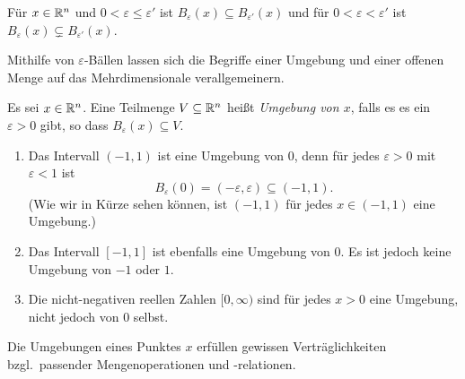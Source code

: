 \documentclass[a4paper,10pt]{article}
\begin{document}
\begin{bem}
 Für $x \in \mathbb{R}^n$ und $0 < \varepsilon \leq \varepsilon'$ ist $B_\varepsilon(x) \subseteq B_{\varepsilon'}(x)$ und für $0 < \varepsilon < \varepsilon'$ ist $B_\varepsilon(x) \subsetneq B_{\varepsilon'}(x)$.
\end{bem}


Mithilfe von $\varepsilon$-Bällen lassen sich die Begriffe einer Umgebung und einer offenen Menge auf das Mehrdimensionale verallgemeinern.


\begin{defi}
 Es sei $x \in \mathbb{R}^n$. Eine Teilmenge $V \subseteq \mathbb{R}^n$ heißt \emph{Umgebung von $x$}, falls es es ein $\varepsilon > 0$ gibt, so dass $B_\varepsilon(x) \subseteq V$.
\end{defi}


\begin{bsp}
 \begin{enumerate}
  \item
   Das Intervall $(-1,1)$ ist eine Umgebung von $0$, denn für jedes $\varepsilon > 0$ mit $\varepsilon < 1$ ist
   \[
    B_\varepsilon(0) = (-\varepsilon, \varepsilon) \subseteq (-1,1).
   \]
   (Wie wir in Kürze sehen können, ist $(-1,1)$ für jedes $x \in (-1,1)$ eine Umgebung.)
  \item
   Das Intervall $[-1,1]$ ist ebenfalls eine Umgebung von $0$. Es ist jedoch keine Umgebung von $-1$ oder $1$.
  \item
   Die nicht-negativen reellen Zahlen $[0,\infty)$ sind für jedes $x > 0$ eine Umgebung, nicht jedoch von $0$ selbst.
 \end{enumerate}
\end{bsp}


Die Umgebungen eines Punktes $x$ erfüllen gewissen Verträglichkeiten bzgl.\ passender Mengenoperationen und -relationen.
\end{document}
